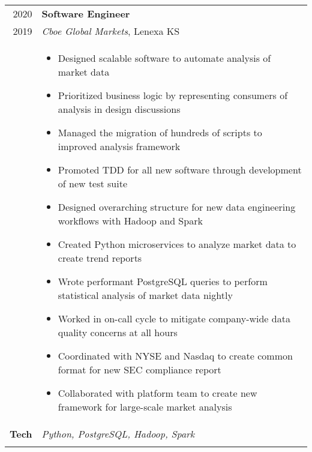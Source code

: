 \documentclass[a4paper,10pt]{article}
\newcommand{\br}{\\\multicolumn{2}{c}{}}
\begin{document}
\begin{tabular}{r|p{15cm}}
  \textsc{2020}  & \textbf{Software Engineer} \\
  \textsc{2019}  & \textit{Cboe Global Markets}, Lenexa KS
  \\ &
       \begin{itemize}
       \item Designed scalable software to automate analysis of market data
       \item Prioritized business logic by representing consumers of analysis in design discussions
       \item Managed the migration of hundreds of scripts to improved analysis framework
       \item Promoted TDD for all new software through development of new test suite
       \item Designed overarching structure for new data engineering workflows with Hadoop and Spark
       \item Created Python microservices to analyze market data to create trend reports
       \item Wrote performant PostgreSQL queries to perform statistical analysis of market data nightly
       \item Worked in on-call cycle to mitigate company-wide data quality concerns at all hours
       \item Coordinated with NYSE and Nasdaq to create common format for new SEC compliance report
       \item Collaborated with platform team to create new framework for large-scale market analysis
       \end{itemize} \\
  \textbf{Tech} & \textit{Python, PostgreSQL, Hadoop, Spark} \br \\
\end{tabular}
\end{document}

